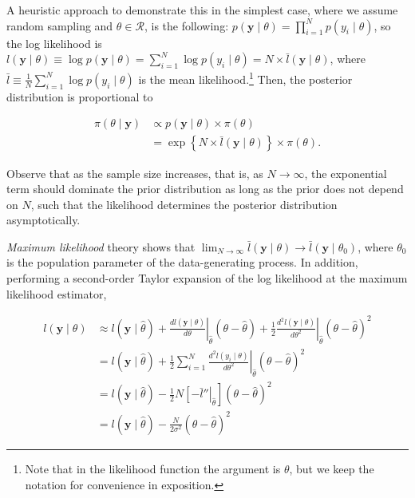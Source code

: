 A heuristic approach to demonstrate this in the simplest case, where we assume random sampling and $\theta \in \mathcal{R}$, is the following: $p(\mathbf{y} \mid \theta) = \prod_{i=1}^N p(y_i \mid \theta)$, so the log likelihood is $l(\mathbf{y} \mid \theta) \equiv \log p(\mathbf{y} \mid \theta) = \sum_{i=1}^N \log p(y_i \mid \theta) = N \times \bar{l}(\mathbf{y} \mid \theta)$, where $\bar{l} \equiv \frac{1}{N} \sum_{i=1}^N \log p(y_i \mid \theta)$ is the mean likelihood.\footnote{Note that in the likelihood function the argument is $\theta$, but we keep the notation for convenience in exposition.} Then, the posterior distribution is proportional to

\begin{align}
	\pi(\theta\mid \mathbf{y})&\propto p(\mathbf{y}\mid \theta) \times \pi(\theta)\nonumber\\
	&=\exp\left\{N\times \bar{l}(\mathbf{y}\mid \theta)\right\} \times \pi(\theta).
\end{align}

Observe that as the sample size increases, that is, as $N \to \infty$, the exponential term should dominate the prior distribution as long as the prior does not depend on $N$, such that the likelihood determines the posterior distribution asymptotically.

\textit{Maximum likelihood} theory shows that $\lim_{N \to \infty} \bar{l}(\mathbf{y} \mid \theta) \to \bar{l}(\mathbf{y} \mid \theta_0)$, where $\theta_0$ is the population parameter of the data-generating process. In addition, performing a second-order Taylor expansion of the log likelihood at the maximum likelihood estimator,

\begin{align*}
	l(\mathbf{y}\mid \theta)&\approx l(\mathbf{y}\mid \hat{\theta})+\left.\frac{dl(\mathbf{y}\mid {\theta})}{d\theta}\right\vert_{\hat{\theta}}(\theta-\hat{\theta})+\frac{1}{2}\left.\frac{d^2l(\mathbf{y}\mid {\theta})}{d\theta^2}\right\vert_{\hat{\theta}}(\theta-\hat{\theta})^2\\
	&= l(\mathbf{y}\mid \hat{\theta})+\frac{1}{2}\left.\sum_{i=1}^N\frac{d^2l(y_i\mid {\theta})}{d\theta^2}\right\vert_{\hat{\theta}}(\theta-\hat{\theta})^2\\
	&= l(\mathbf{y}\mid \hat{\theta})-\frac{1}{2}\left.N\left[-\bar{l}''\right\vert_{\hat{\theta}}\right](\theta-\hat{\theta})^2\\ 
	&= l(\mathbf{y}\mid \hat{\theta})-\frac{N}{2\sigma^2}(\theta-\hat{\theta})^2 
\end{align*}

